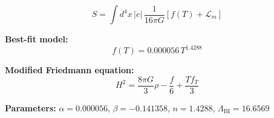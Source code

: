 
\begin{equation}
  S = \int d^4x \, |e| \, \frac{1}{16\pi G} \left[ f(T) + \mathcal{L}_m \right]
\end{equation}

\textbf{Best-fit model:}
\begin{equation}
  f(T) = 0.000056 \, T^{1.4288}
\end{equation}

\textbf{Modified Friedmann equation:}
\begin{equation}
  H^2 = \frac{8\pi G}{3} \rho - \frac{f}{6} + \frac{T f_T}{3}
\end{equation}

\textbf{Parameters:}
$\alpha = 0.000056$, \quad
$\beta = -0.141358$, \quad
$n = 1.4288$, \quad
$\Lambda_{\text{BI}} = 16.6569$